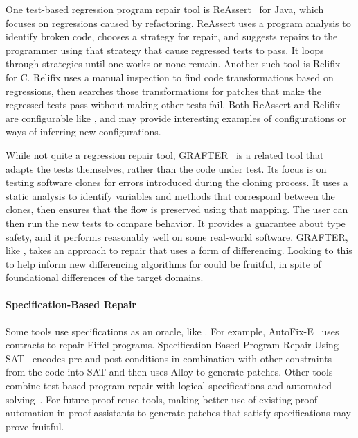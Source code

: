 One test-based regression program repair tool is ReAssert~\cite{daniel2009reassert} for Java,
which focuses on regressions caused by refactoring.
ReAssert uses a program analysis to identify broken code,
chooses a strategy for repair, and suggests repairs to the programmer using that strategy that cause regressed tests to pass.
It loops through strategies until one works or none remain.
Another such tool is Relifix~\cite{Tan:2015:RAR:2818754.2818813} for C.
Relifix uses a manual inspection to find code transformations based on regressions, then searches those transformations for 
patches that make the regressed tests pass without making other tests fail.
Both ReAssert and Relifix are configurable like \sysnamelong, and may provide interesting examples of configurations
or ways of inferring new configurations.

While not quite a regression repair tool, GRAFTER~\cite{Zhang:2017:ATD:3097368.3097448} is a related tool that adapts the tests themselves,
rather than the code under test. Its focus is on testing software clones for errors introduced during the
cloning process. It uses a static analysis to identify variables and methods that correspond between the clones,
then ensures that the flow is preserved using that mapping. The user can then run the new tests to compare behavior.
It provides a guarantee about type safety, and it performs reasonably well on some real-world software.
GRAFTER, like \toolnamec, takes an approach to repair that uses a form of differencing.
Looking to this to help inform new differencing algorithms for \sysnamelong could be fruitful,
in spite of foundational differences of the target domains.

\paragraph{Specification-Based Repair}
Some tools use specifications as an oracle, like \sysnamelong.
For example, AutoFix-E~\cite{Wei:2010:AFP:1831708.1831716, pei2014automated} uses contracts to repair Eiffel programs. 
Specification-Based Program Repair Using SAT~\cite{gopinath2011specification}
encodes pre and post conditions in combination with other constraints from the code 
into SAT and then uses Alloy to generate patches.
Other tools combine test-based program repair with logical specifications and automated solving~\cite{10.1007/978-3-540-24721-0_20, nguyen2013semfix, nguyen2013semfix, Xuan:2017:NAR:3071893.3071964, Mechtaev:2015:DLS:2818754.2818811, Ke:2015:RPS:2916135.2916260}.
For future proof reuse tools, making better use of existing proof automation in proof assistants to generate
patches that satisfy specifications may prove fruitful.

